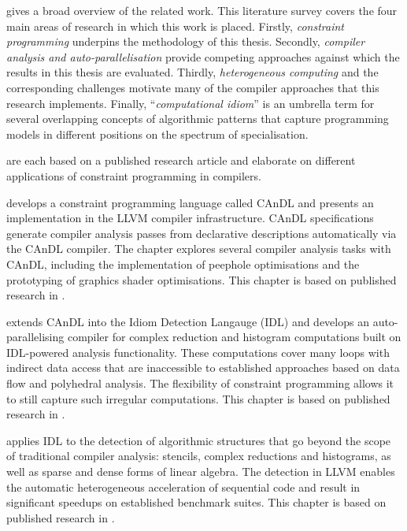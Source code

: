     {\bf{}} gives a broad overview of the related work.
    This literature survey covers the four main areas of research in which this
    work is placed.
    Firstly, {\em constraint programming} underpins the methodology of this
    thesis.
    Secondly, {\em compiler analysis and auto-parallelisation} provide
    competing approaches against which the results in this thesis are evaluated.
    Thirdly, {\em heterogeneous computing} and the corresponding challenges
    motivate many of the compiler approaches that this research implements.
    Finally, ``{\em computational idiom}'' is an umbrella term for several
    overlapping concepts of algorithmic patterns that capture programming models
    in different positions on the spectrum of specialisation.

    {\bf{}}
    are each based on a published research article and elaborate on different
    applications of constraint programming in compilers.

    {\bf{}} develops a constraint programming language called
    CAnDL and presents an implementation in the LLVM compiler infrastructure.
    CAnDL specifications generate compiler analysis
    passes from declarative descriptions automatically via the CAnDL compiler.
    The chapter explores several compiler analysis tasks with CAnDL,
    including the implementation of peephole optimisations and the
    prototyping of graphics shader optimisations.
    This chapter is based on published research in
    \citet{Ginsbach:2018:CDS:3178372.3179515}.

    {\bf{}} extends CAnDL into the Idiom Detection
    Langauge (IDL) and develops an auto-parallelising compiler for
    complex reduction and histogram computations built on IDL-powered analysis
    functionality.
    These computations cover many loops with indirect data access that are
    inaccessible to established approaches based on data flow and polyhedral
    analysis.
    The flexibility of constraint programming allows it to still capture such
    irregular computations.
    This chapter is based on published research in
    \citet{ginsbach2017discovery}.

    {\bf{}} applies IDL to the detection of algorithmic
    structures that go beyond the scope of traditional compiler analysis:
    stencils, complex reductions and histograms, as well as sparse and dense
    forms of linear algebra.
    The detection in LLVM enables the automatic heterogeneous
    acceleration of sequential code and result in significant speedups on
    established benchmark suites.
    This chapter is based on published research in
    \citet{Ginsbach:2018:AML:3173162.3173182}.
